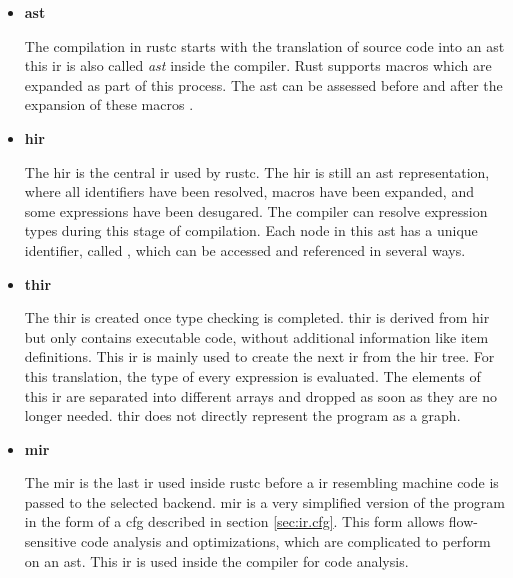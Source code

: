 \begin{itemize}
    \item \textbf{\acrfull{ast}} \label{sec:plan.rir.ast}

        The compilation in rustc starts with the translation of source code into an \acrshort{ast} this \acrshort{ir} is also called \emph{\acrshort{ast}} inside the compiler. Rust supports macros which are expanded as part of this process. \cite{rustcdev2020.syntax} The \acrshort{ast} can be assessed before and after the expansion of these macros \cite{rust-lang0000.docs-lintstore}.

    \newpage
    \item \textbf{\acrfull{hir}} \label{sec:plan.rir.hir}

        The \acrfull{hir} is the central \acrshort{ir} used by rustc. The \acrshort{hir} is still an \acrshort{ast} representation, where all identifiers have been resolved, macros have been expanded, and some expressions have been desugared. The compiler can resolve expression types during this stage of compilation. Each node in this \acrshort{ast} has a unique identifier, called , which can be accessed and referenced in several ways. \cite{rustcdev2020.hir}
        
    \item \textbf{\acrfull{thir}}
    
        The \acrfull{thir} is created once type checking is completed. \acrshort{thir} is derived from \acrshort{hir} but only contains executable code, without additional information like item definitions. This \acrshort{ir} is mainly used to create the next \acrshort{ir} from the \acrshort{hir} tree. For this translation, the type of every expression is evaluated. The elements of this \acrshort{ir} are separated into different arrays and dropped as soon as they are no longer needed. \acrshort{thir} does not directly represent the program as a graph. \cite{rustcdev2020.thir}
    
    \item \textbf{\acrfull{mir}}
    
        The \acrshort{mir} is the last \acrshort{ir} used inside rustc before a \acrshort{ir} resembling machine code is passed to the selected backend. \acrshort{mir} is a very simplified version of the program in the form of a \acrlong{cfg} described in section \ref{sec:ir.cfg}. This form allows flow-sensitive code analysis and optimizations, which are complicated to perform on an \acrshort{ast}.  This \acrshort{ir} is used inside the compiler for code analysis. \cite{matsakis2016.mir}
\end{itemize}


